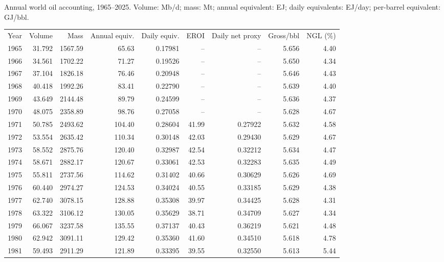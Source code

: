\documentclass[reprint,aps,pra,longbibliography,floatfix]{revtex4-2}
\begin{document}
\begin{minipage}{\textwidth}
\par\medskip
\begingroup\centering\footnotesize
\makeatletter{}\makeatother
\caption{Annual world oil accounting, 1965--2025. Volume: Mb/d; mass: Mt; annual equivalent: EJ; daily equivalents: EJ/day; per-barrel equivalent: GJ/bbl.}\label{tab:annual}
\renewcommand{\arraystretch}{0.94}
\setlength{\tabcolsep}{5pt}
\begin{ruledtabular}\begin{tabular}{rrrrrrrrr}
Year & Volume & Mass & Annual equiv. & Daily equiv. & EROI & Daily net proxy & Gross/bbl & NGL (\%)\\
1965 & 31.792 & 1567.59 & 65.63 & 0.17981 & -- & -- & 5.656 & 4.40 \\
1966 & 34.561 & 1702.22 & 71.27 & 0.19526 & -- & -- & 5.650 & 4.34 \\
1967 & 37.104 & 1826.18 & 76.46 & 0.20948 & -- & -- & 5.646 & 4.43 \\
1968 & 40.418 & 1992.26 & 83.41 & 0.22790 & -- & -- & 5.639 & 4.40 \\
1969 & 43.649 & 2144.48 & 89.79 & 0.24599 & -- & -- & 5.636 & 4.37 \\
1970 & 48.075 & 2358.89 & 98.76 & 0.27058 & -- & -- & 5.628 & 4.67 \\
1971 & 50.785 & 2493.62 & 104.40 & 0.28604 & 41.99 & 0.27922 & 5.632 & 4.58 \\
1972 & 53.554 & 2635.42 & 110.34 & 0.30148 & 42.03 & 0.29430 & 5.629 & 4.67 \\
1973 & 58.552 & 2875.76 & 120.40 & 0.32987 & 42.54 & 0.32212 & 5.634 & 4.47 \\
1974 & 58.671 & 2882.17 & 120.67 & 0.33061 & 42.53 & 0.32283 & 5.635 & 4.49 \\
1975 & 55.811 & 2737.56 & 114.62 & 0.31402 & 40.66 & 0.30629 & 5.626 & 4.69 \\
1976 & 60.440 & 2974.27 & 124.53 & 0.34024 & 40.55 & 0.33185 & 5.629 & 4.38 \\
1977 & 62.740 & 3078.15 & 128.88 & 0.35308 & 39.97 & 0.34425 & 5.628 & 4.31 \\
1978 & 63.322 & 3106.12 & 130.05 & 0.35629 & 38.71 & 0.34709 & 5.627 & 4.34 \\
1979 & 66.067 & 3237.58 & 135.55 & 0.37137 & 40.43 & 0.36219 & 5.621 & 4.48 \\
1980 & 62.942 & 3091.11 & 129.42 & 0.35360 & 41.60 & 0.34510 & 5.618 & 4.78 \\
1981 & 59.493 & 2911.29 & 121.89 & 0.33395 & 39.55 & 0.32550 & 5.613 & 5.44 \\

\end{tabular}
\end{ruledtabular}
\end{minipage}
\end{document}
